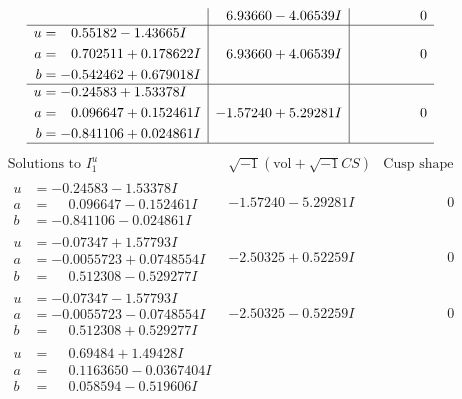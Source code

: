 \documentclass[1p]{elsarticle_modified}
\theoremstyle{definition}
\newcommand{\I}{\sqrt{-1}}
\begin{document}
$$\begin{array}{c|c|c}
 & \phantom{-}6.93660 - 4.06539 I & \phantom{-0.000000 } 0 \\ \hline\begin{aligned}
u &= \phantom{-}0.55182 - 1.43665 I \\
a &= \phantom{-}0.702511 + 0.178622 I \\
b &= -0.542462 + 0.679018 I\end{aligned}
 & \phantom{-}6.93660 + 4.06539 I & \phantom{-0.000000 } 0 \\ \hline\begin{aligned}
u &= -0.24583 + 1.53378 I \\
a &= \phantom{-}0.096647 + 0.152461 I \\
b &= -0.841106 + 0.024861 I\end{aligned}
 & -1.57240 + 5.29281 I & \phantom{-0.000000 } 0\\
 \hline 
 \end{array}$$\newpage$$\begin{array}{c|c|c}  
\text{Solutions to }I^u_{1}& \I (\text{vol} + \sqrt{-1}CS) & \text{Cusp shape}\\
 \hline 
\begin{aligned}
u &= -0.24583 - 1.53378 I \\
a &= \phantom{-}0.096647 - 0.152461 I \\
b &= -0.841106 - 0.024861 I\end{aligned}
 & -1.57240 - 5.29281 I & \phantom{-0.000000 } 0 \\ \hline\begin{aligned}
u &= -0.07347 + 1.57793 I \\
a &= -0.0055723 + 0.0748554 I \\
b &= \phantom{-}0.512308 - 0.529277 I\end{aligned}
 & -2.50325 + 0.52259 I & \phantom{-0.000000 } 0 \\ \hline\begin{aligned}
u &= -0.07347 - 1.57793 I \\
a &= -0.0055723 - 0.0748554 I \\
b &= \phantom{-}0.512308 + 0.529277 I\end{aligned}
 & -2.50325 - 0.52259 I & \phantom{-0.000000 } 0 \\ \hline\begin{aligned}
u &= \phantom{-}0.69484 + 1.49428 I \\
a &= \phantom{-}0.1163650 - 0.0367404 I \\
b &= \phantom{-}0.058594 - 0.519606 I\end{aligned}

\end{array}$$
\end{document}

